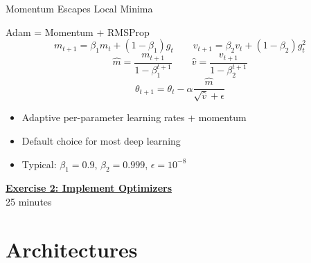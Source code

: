 \documentclass[aspectratio=169]{beamer}
\begin{document}
\begin{frame}{Momentum Escapes Local Minima}
\begin{center}
\end{center}
\end{frame}

\begin{frame}{Adam = Momentum + RMSProp \cite{kingma2014}}
$$m_{t+1} = \beta_1 m_t + (1-\beta_1) g_t \qquad v_{t+1} = \beta_2 v_t + (1-\beta_2) g_t^2$$
$$\hat{m} = \frac{m_{t+1}}{1-\beta_1^{t+1}} \qquad \hat{v} = \frac{v_{t+1}}{1-\beta_2^{t+1}}$$
$$\theta_{t+1} = \theta_t - \alpha \frac{\hat{m}}{\sqrt{\hat{v}} + \epsilon}$$
\begin{itemize}
\item Adaptive per-parameter learning rates + momentum
\item Default choice for most deep learning
\item Typical: $\beta_1=0.9$, $\beta_2=0.999$, $\epsilon=10^{-8}$
\end{itemize}
\end{frame}

\begin{frame}{}
\centering
\Large \href{https://colab.research.google.com/github/iliad-team/iliad-intensive-C.1.1/blob/main/lectures/01_a_ml_foundations/exercises/02_optimizers/notebook.ipynb}{\textbf{Exercise 2: Implement Optimizers}} \\[1em]
\normalsize 25 minutes \\[1em]
\end{frame}

\section{Architectures}
\end{document}
